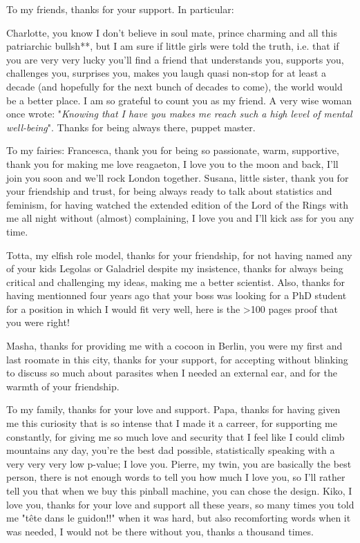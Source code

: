To my friends, thanks for your support. In particular: \par
Charlotte, you know I don't believe in soul mate, prince charming and all this patriarchic bullsh**, but I am sure if little girls were told the truth, i.e. that if you are very very lucky you'll find a friend that understands you, supports you, challenges you, surprises you, makes you laugh quasi non-stop for at least a decade (and hopefully for the next bunch of decades to come), the world would be a better place. I am so grateful to count you as my friend. A very wise woman once wrote: "\textit{Knowing that I have you makes me reach such a high level of mental well-being}". Thanks for being always there, puppet master.\par
To my fairies: Francesca, thank you for being so passionate, warm, supportive, thank you for making me love reagaeton, I love you to the moon and back, I'll join you soon and we'll rock London together. Susana, little sister, thank you for your friendship and trust, for being always ready to talk about statistics and feminism, for having watched the extended edition of the Lord of the Rings with me all night without (almost) complaining, I love you and I'll kick ass for you any time.\par
Totta, my elfish role model, thanks for your friendship, for not having named any of your kids Legolas or Galadriel despite my insistence, thanks for always being critical and challenging my ideas, making me a better scientist. Also, thanks for having mentionned four years ago that your boss was looking for a PhD student for a position in which I would fit very well, here is the >100 pages proof that you were right!\par
Masha, thanks for providing me with a cocoon in Berlin, you were my first and last roomate in this city, thanks for your support, for accepting without blinking to discuss so much about parasites when I needed an external ear, and for the warmth of your friendship.\par

To my family, thanks for your love and support. Papa, thanks for having given me this curiosity that is so intense that I made it a carreer, for supporting me constantly, for giving me so much love and security that I feel like I could climb mountains any day, you're the best dad possible, statistically speaking with a very very very low p-value; I love you. Pierre, my twin, you are basically the best person, there is not enough words to tell you how much I love you, so I'll rather tell you that when we buy this pinball machine, you can chose the design. Kiko, I love you, thanks for your love and support all these years, so many times you told me "tête dans le guidon!!" when it was hard, but also recomforting words when it was needed, I would not be there without you, thanks a thousand times.
